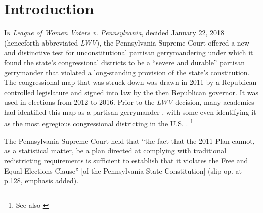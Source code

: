     \section{Introduction}
    \lettrine[lines=3, lraise=0.1, nindent=0em]{\color{lightgray}I}{n} \textit{League of Women Voters v. Pennsylvania}, decided January 22, 2018 (henceforth abbreviated \textit{LWV}), the Pennsylvania Supreme Court offered a new and distinctive test for unconstitutional partisan gerrymandering under which it found the state’s congressional districts to be a ``severe and durable'' partisan gerrymander that violated a long-standing provision of the state’s constitution. The congressional map that was struck down was drawn in 2011 by a Republican-controlled legislature and signed into law by the then Republican governor. It was used in elections from 2012 to 2016. Prior to the \textit{LWV} decision, many academics had identified this map as a partisan gerrymander \citep[see e.g.,][]{Royden2017}, with some even identifying it as the most egregious congressional districting in the U.S. \citep[][ esp. Figure 3]{Wang2016_SLR}.
        \footnote{See also \citet{Mcgann_et_al_2015_ELJ, McGann_et_al_2016_gerrymandering}}
\par
    The Pennsylvania Supreme Court held that ``the fact that the 2011 Plan cannot, as a statistical matter, be a plan directed at complying with traditional redistricting requirements is \underline{sufficient} to establish that it violates the Free and Equal Elections Clause'' [of the Pennsylvania State Constitution] (slip op. at p.128, emphasis added).
